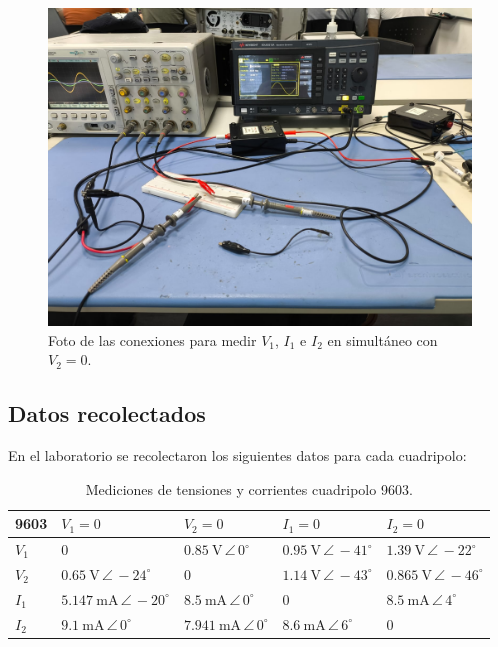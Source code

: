     \begin{figure}[H]
        \centering
        \includegraphics[width=0.5\linewidth]{V2=0.png}
    \caption{Foto de las conexiones para medir $ V_1 $, $ I_1 $ e $ I_2 $ en simultáneo con $ V_2 = 0 $.}
    \label{fig: fotoConexionesOsciloscopio}
    \end{figure}

    \subsection{Datos recolectados}
    
    En el laboratorio se recolectaron los siguientes datos para cada cuadripolo:
    
   \begin{table}[H]
\centering
\begin{tabular}{|l|l|l|l|l|}
\hline
\textbf{9603} & $V_1=0$ & $V_2=0$ & $I_1=0$ & $I_2=0$ \\ \hline 
$V_1$ & $0$ & $0.85\ \mathrm{V}\,\angle\,0^\circ$ & $0.95\ \mathrm{V}\,\angle\,-41^\circ$ & $1.39\ \mathrm{V}\,\angle\,-22^\circ$ \\ \hline
$V_2$ & $0.65\ \mathrm{V}\,\angle\,-24^\circ$ & $0$ & $1.14\ \mathrm{V}\,\angle\,-43^\circ$ & $0.865\ \mathrm{V}\,\angle\,-46^\circ$ \\ \hline
$I_1$ & $5.147\ \mathrm{mA}\,\angle\,-20^\circ$ & $8.5\ \mathrm{mA}\,\angle\,0^\circ$ & $0$ & $8.5\ \mathrm{mA}\,\angle\,4^\circ$ \\ \hline
$I_2$ & $9.1\ \mathrm{mA}\,\angle\,0^\circ$ & $7.941\ \mathrm{mA}\,\angle\,0^\circ$ & $8.6\ \mathrm{mA}\,\angle\,6^\circ$ & $0$ \\ \hline
\end{tabular}
\caption{Mediciones de tensiones y corrientes cuadripolo 9603.}
\label{tab:mediciones9603}
\end{table}

